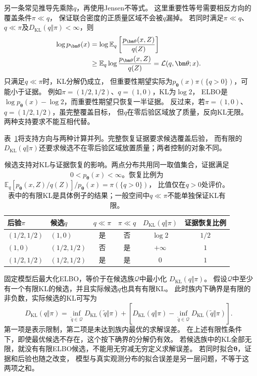 另一条常见推导先乘除\(q\)，再使用Jensen不等式。
这里重要性等号需要相反方向的覆盖条件\(\pi\ll q\)，
保证联合密度的正质量区域不会被\(q\)漏掉。
若同时满足\(\pi\ll q\)、\(q\ll\pi\)及\(D_{\mathrm{KL}}(q\Vert\pi)<\infty\)，则
\begin{align}
  \log p_{\bm\theta}(x)
  &=\log\mathbb E_q\left[\frac{p_{\bm\theta}(x,Z)}{q(Z)}\right]\notag\\
  &\geq\mathbb E_q\log\frac{p_{\bm\theta}(x,Z)}{q(Z)}
   =\mathcal L(q,\bm\theta;x).
  \label{eq:information-elbo-jensen}
\end{align}
只满足\(q\ll\pi\)时，KL分解仍成立，
但重要性期望实际为\(p_{\bm\theta}(x)\pi(\{q>0\})\)，可能小于证据。
例如\(\pi=(1/2,1/2)\)、\(q=(1,0)\)，KL为\(\log2\)，
ELBO是\(\log p_{\bm\theta}(x)-\log2\)，而重要性期望只恢复一半证据。
反过来，若\(\pi=(1,0)\)、\(q=(1/2,1/2)\)，虽完整覆盖目标，
但\(q\)在零后验区域放了质量，反向KL无限。两种支持要求不能互相代替。

表~\ref{tab:information-candidate-support}将支持方向与两种计算并列。完整恢复证据要求候选覆盖后验，
而有限的\(D_{\mathrm{KL}}(q\Vert\pi)\)还要求候选不在零后验区域放置质量；两者控制的对象不同。
\begin{table}[htbp]
  \centering\small
  \begin{tabularx}{\linewidth}{XXcccc}
    \toprule
    后验\(\pi\) & 候选\(q\) & \(q\ll\pi\) & \(\pi\ll q\) & \(D_{\mathrm{KL}}(q\Vert\pi)\) & 证据恢复比例\\
    \midrule
    \((1/2,1/2)\) & \((1,0)\) & 是 & 否 & \(\log2\) & \(1/2\)\\
    \((1,0)\) & \((1/2,1/2)\) & 否 & 是 & \(+\infty\) & \(1\)\\
    \((1/2,1/2)\) & \((1/2,1/2)\) & 是 & 是 & \(0\) & \(1\)\\
    \bottomrule
  \end{tabularx}
  \caption{候选支持对KL与证据恢复的影响。两点分布共用同一取值集合，证据满足
  \(0<p_{\bm\theta}(x)<\infty\)。恢复比例为\(\mathbb E_q[p_{\bm\theta}(x,Z)/q(Z)]/p_{\bm\theta}(x)=\pi(\{q>0\})\)，
  比值仅在\(q>0\)处评价。表中的有限KL是具体例子的结果；一般空间中\(q\ll\pi\)不能单独保证KL有限。}
  \label{tab:information-candidate-support}
\end{table}

固定模型后最大化ELBO，等价于在候选族\(\mathcal Q\)中最小化
\(D_{\mathrm{KL}}(q\Vert\pi)\)。
假设\(\mathcal Q\)中至少有一个有限KL的候选，并且实际候选\(q\)也具有有限KL。
此时族内下确界是有限的非负数，实际候选的KL可写为
\[
  D_{\mathrm{KL}}(q\Vert\pi)
  =\inf_{\widetilde q\in\mathcal Q}D_{\mathrm{KL}}(\widetilde q\Vert\pi)
   +\left[D_{\mathrm{KL}}(q\Vert\pi)
    -\inf_{\widetilde q\in\mathcal Q}D_{\mathrm{KL}}(\widetilde q\Vert\pi)\right].
\]
第一项是表示限制，第二项是未达到族内最优的求解误差。
在上述有限性条件下，即使最优候选不存在，这个按下确界的分解仍有效。
若候选族中的KL全部无限，就没有有限ELBO候选，不能用无穷减无穷定义求解误差。
若同时拟合\(\bm\theta\)，证据和后验也随之改变，
模型与真实观测分布的拟合误差是另一层问题，不等于这两项之和。

